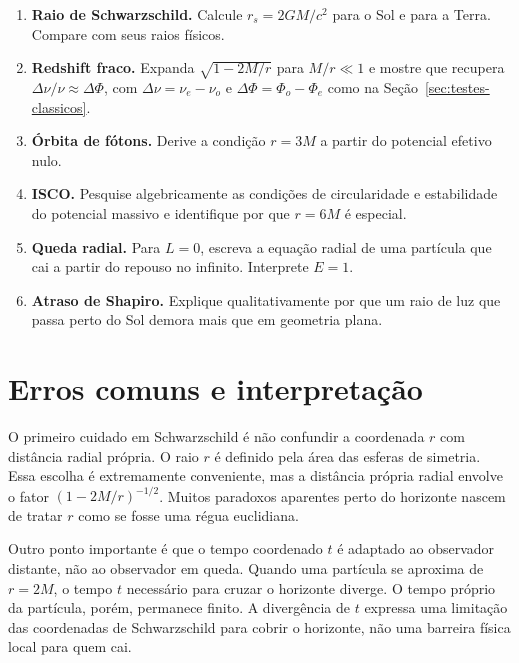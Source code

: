 \documentclass[12pt,a4paper,oneside]{book}
\theoremstyle{rgplain}
\theoremstyle{rgremark}
\begin{document}
\begin{enumerate}
  \item \textbf{Raio de Schwarzschild.} Calcule $r_s=2GM/c^2$ para o Sol e para
  a Terra. Compare com seus raios físicos.

  \item \textbf{Redshift fraco.} Expanda
  $\sqrt{1-2M/r}$ para $M/r\ll1$ e mostre que recupera
  $\Delta\nu/\nu\approx\Delta\Phi$, com $\Delta\nu=\nu_e-\nu_o$ e
  $\Delta\Phi=\Phi_o-\Phi_e$ como na Seção~\ref{sec:testes-classicos}.

  \item \textbf{Órbita de fótons.} Derive a condição $r=3M$ a partir do
  potencial efetivo nulo.

  \item \textbf{ISCO.} Pesquise algebricamente as condições de circularidade e
  estabilidade do potencial massivo e identifique por que $r=6M$ é especial.

  \item \textbf{Queda radial.} Para $L=0$, escreva a equação radial de uma
  partícula que cai a partir do repouso no infinito. Interprete $E=1$.

  \item \textbf{Atraso de Shapiro.} Explique qualitativamente por que um raio
  de luz que passa perto do Sol demora mais que em geometria plana.
\end{enumerate}

\section{Erros comuns e interpretação}

O primeiro cuidado em Schwarzschild é não confundir a coordenada $r$ com
distância radial própria. O raio $r$ é definido pela área das esferas de
simetria. Essa escolha é extremamente conveniente, mas a distância própria
radial envolve o fator $(1-2M/r)^{-1/2}$. Muitos paradoxos aparentes perto do
horizonte nascem de tratar $r$ como se fosse uma régua euclidiana.

Outro ponto importante é que o tempo coordenado $t$ é adaptado ao observador
distante, não ao observador em queda. Quando uma partícula se aproxima de
$r=2M$, o tempo $t$ necessário para cruzar o horizonte diverge. O tempo próprio
da partícula, porém, permanece finito. A divergência de $t$ expressa uma
limitação das coordenadas de Schwarzschild para cobrir o horizonte, não uma
barreira física local para quem cai.
\end{document}
